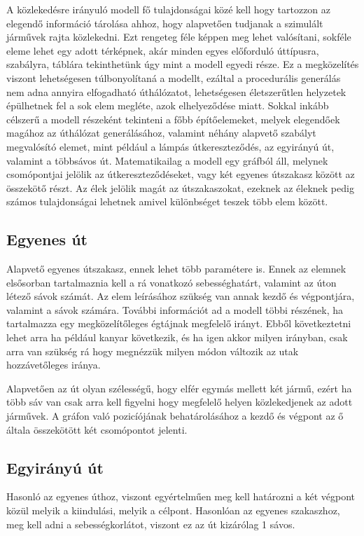 ﻿

A közlekedésre irányuló modell fő tulajdonságai közé kell hogy tartozzon az elegendő információ tárolása ahhoz, hogy alapvetően tudjanak a szimulált 
járművek rajta közlekedni. Ezt rengeteg féle képpen meg lehet valósítani, sokféle eleme lehet egy adott térképnek, akár minden egyes előforduló úttípusra, 
szabályra, táblára tekinthetünk úgy mint a modell egyedi része. Ez a megközelítés viszont lehetségesen túlbonyolítaná a modellt, ezáltal a procedurális generálás
nem adna annyira elfogadható úthálózatot, lehetségesen életszerűtlen helyzetek épülhetnek fel a sok elem megléte, azok elhelyeződése miatt. Sokkal inkább célszerű a 
modell részeként tekinteni a főbb építőelemeket, melyek elegendőek magához az úthálózat generálásához, valamint néhány alapvető szabályt megvalósító elemet, mint például 
a lámpás útkereszteződés, az egyirányú út, valamint a többsávos út.
Matematikailag a modell egy gráfból áll, melynek csomópontjai jelölik az útkereszteződéseket, vagy két egyenes útszakasz között az összekötő részt. Az élek jelölik magát az útszakaszokat, ezeknek az éleknek pedig számos tulajdonságai lehetnek amivel különbséget teszek több elem között.
\subsection{Egyenes út}
Alapvető egyenes útszakasz, ennek lehet több paramétere is. Ennek az elemnek elsősorban tartalmaznia kell a rá vonatkozó sebességhatárt, valamint az úton létező sávok számát.
Az elem leírásához szükség van annak kezdő és végpontjára, valamint a sávok számára. További információt ad a modell többi részének, ha tartalmazza egy megközelítőleges égtájnak megfelelő irányt. Ebből következtetni lehet arra ha például kanyar következik, és ha igen akkor milyen irányban, csak arra van szükség rá hogy megnézzük milyen módon változik az utak hozzávetőleges iránya.

Alapvetően az út olyan szélességű, hogy elfér egymás mellett két jármű, ezért ha több sáv van csak arra kell figyelni hogy megfelelő helyen közlekedjenek az adott járművek. A gráfon való pozicíójának behatárolásához a kezdő és végpont az ő általa összekötött két csomópontot jelenti.
\subsection{Egyirányú út}
Hasonló az egyenes úthoz, viszont egyértelműen meg kell határozni a két végpont közül melyik a kiindulási, melyik a célpont. Hasonlóan az egyenes szakaszhoz, meg kell adni a sebességkorlátot, viszont ez az út kizárólag 1 sávos.

